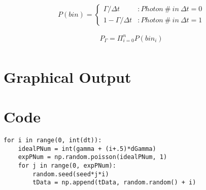 \documentclass[aps,letterpaper,10pt]{revtex4}
\begin{document}
\begin{displaymath}
   P(bin) = \left\{
     \begin{array}{lr}
       \Gamma /\Delta t & : Photon\ \#\ in\ \Delta t = 0\\
       1-\Gamma /\Delta t & : Photon\ \#\ in\ \Delta t = 1
     \end{array}
   \right.
\end{displaymath}

\begin{gather*}
	P_\Gamma = \Pi_{i = 0}^{n} P(bin_i)\\
\end{gather*}

\vspace{3mm} 

\section{Graphical Output}

\begin{figure}[h!]
\vspace{3mm}
\end{figure}

\begin{figure}[h!]
\vspace{3mm}
\end{figure}

\begin{figure}[h!]
\vspace{3mm}
\end{figure}

\section{Code}

\begin{verbatim}
for i in range(0, int(dt)):
    idealPNum = int(gamma + (i+.5)*dGamma)
    expPNum = np.random.poisson(idealPNum, 1)
    for j in range(0, expPNum):
        random.seed(seed*j*i)
        tData = np.append(tData, random.random() + i)
\end{verbatim}
\end{document}
